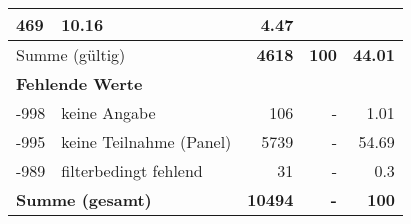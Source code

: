 \begin{longtable}{lXrrr}
       \num{469} &
       \num[round-mode=places,round-precision=2]{10,16} &
         \num[round-mode=places,round-precision=2]{4,47} \\
     \midrule
     \multicolumn{2}{l}{Summe (gültig)} &
       \textbf{\num{4618}} &
     \textbf{100} &
       \textbf{\num[round-mode=places,round-precision=2]{44,01}} \\
     \multicolumn{5}{l}{\textbf{Fehlende Werte}}\\
       -998 &
       keine Angabe &
         \num{106} &
        - &
         \num[round-mode=places,round-precision=2]{1,01} \\
       -995 &
       keine Teilnahme (Panel) &
         \num{5739} &
        - &
         \num[round-mode=places,round-precision=2]{54,69} \\
       -989 &
       filterbedingt fehlend &
         \num{31} &
        - &
         \num[round-mode=places,round-precision=2]{0,3} \\
     \midrule
     \multicolumn{2}{l}{\textbf{Summe (gesamt)}} &
          \textbf{\num{10494}} &
        \textbf{-} &
        \textbf{100} \\
     \bottomrule
     \end{longtable}
     
